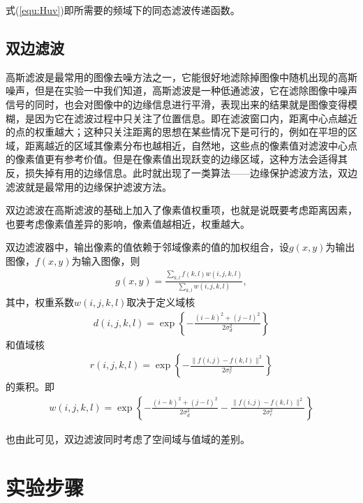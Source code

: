 \documentclass{hitreport}
\begin{document}
式(\ref{equ:Huv})即所需要的频域下的同态滤波传递函数。


\subsection{双边滤波}\label{sec:shuangbian}

高斯滤波是最常用的图像去噪方法之一，它能很好地滤除掉图像中随机出现的高斯噪声，但是在实验一中我们知道，高斯滤波是一种低通滤波，它在滤除图像中噪声信号的同时，也会对图像中的边缘信息进行平滑，表现出来的结果就是图像变得模糊，是因为它在滤波过程中只关注了位置信息。即在滤波窗口内，距离中心点越近的点的权重越大；这种只关注距离的思想在某些情况下是可行的，例如在平坦的区域，距离越近的区域其像素分布也越相近，自然地，这些点的像素值对滤波中心点的像素值更有参考价值。但是在像素值出现跃变的边缘区域，这种方法会适得其反，损失掉有用的边缘信息。此时就出现了一类算法——边缘保护滤波方法，双边滤波就是最常用的边缘保护滤波方法。

双边滤波在高斯滤波的基础上加入了像素值权重项，也就是说既要考虑距离因素，也要考虑像素值差异的影响，像素值越相近，权重越大。

双边滤波器中，输出像素的值依赖于邻域像素的值的加权组合，设$g\left(x,y\right)$为输出图像，$f\left(x,y\right)$为输入图像，则
\begin{align}
g\left(x,y\right) = \frac{\sum_{k,l} f\left(k,l\right)w\left(i,j,k,l\right)}{\sum_{k,l}w\left(i,j,k,l\right)},
\end{align}
其中，权重系数$w\left(i,j,k,l\right)$取决于定义域核
\begin{align}
d\left(i,j,k,l\right) = \exp \left\{-\frac{\left(i-k\right)^2+\left(j-l\right)^2}{2\sigma_d^2}\right\}
\end{align}
和值域核
\begin{align}
r\left(i,j,k,l\right) = \exp \left\{-\frac{\lVert f\left(i,j\right) - f\left(k,l\right) \rVert^2}{2\sigma_r^2}\right\}
\end{align}
的乘积。即
\begin{align}
w\left(i,j,k,l\right) = \exp \left\{-\frac{\left(i-k\right)^2+\left(j-l\right)^2}{2\sigma_d^2}-\frac{\lVert f\left(i,j\right) - f\left(k,l\right) \rVert^2}{2\sigma_r^2}\right\}
\end{align}

也由此可见，双边滤波同时考虑了空间域与值域的差别。

\section{实验步骤}
\end{document}
